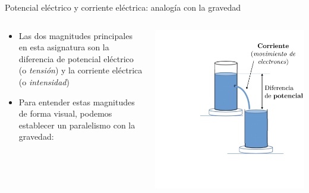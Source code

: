 \documentclass[aspectratio=169, xcolor={usenames,svgnames,dvipsnames}]{beamer}
\begin{document}
\begin{frame}{Potencial eléctrico y corriente eléctrica: \hspace{5mm}analogía con la gravedad}
    \begin{columns}
    \begin{column}{0.5\columnwidth}

        \vspace{-25mm}
        
        \begin{itemize}
         \item Las dos magnitudes principales en esta asignatura son la diferencia de \alert{potencial eléctrico} (o \textit{tensión}) y la \alert{corriente eléctrica} (o \textit{intensidad})

        \vspace{5mm}
        
        \item Para entender estas magnitudes de forma visual, podemos establecer un \alert{paralelismo con la gravedad}:
        \end{itemize}
    \end{column}  
    \begin{column}{0.5\columnwidth}
        \vspace{5mm}
        
        \includegraphics[height=0.9\textheight]{../figs/analogia_gravedad1.pdf}
    \end{column}
    \end{columns}
    
    
\end{frame}
\end{document}
